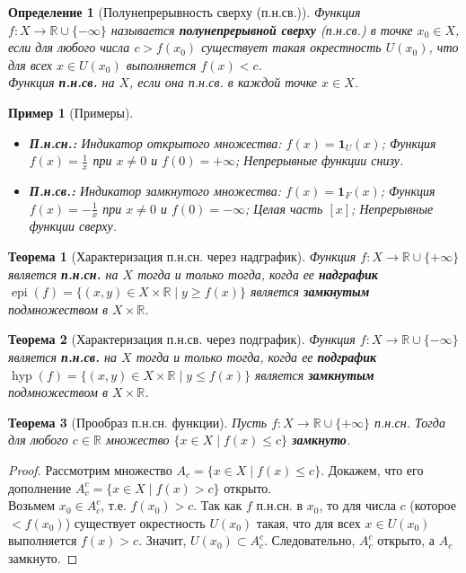 \documentclass[a4paper, 12pt]{article}
\newtheorem{definition}{Определение}
\newtheorem{theorem}{Теорема}
\newtheorem{example}{Пример}
\newcommand{\R}{\mathbb{R}}
\newcommand{\1}{\mathbf{1}}
\begin{document}
\begin{definition}[Полунепрерывность сверху (п.н.св.)]
    Функция $f: X \to \R \cup \{-\infty\}$ называется \textbf{полунепрерывной сверху} (п.н.св.) в точке $x_0 \in X$, если для любого числа $c > f(x_0)$ существует такая окрестность $U(x_0)$, что для всех $x \in U(x_0)$ выполняется $f(x) < c$. \\
    Функция \textbf{п.н.св.} на $X$, если она п.н.св. в каждой точке $x \in X$.
\end{definition}

\begin{example}[Примеры]
    \hfill
    \begin{itemize}
        \item \textbf{П.н.сн.:} Индикатор открытого множества: $f(x) = \1_U(x)$; Функция $f(x) = \frac{1}{x}$ при $x \neq 0$ и $f(0) = +\infty$; Непрерывные функции снизу.
        \item \textbf{П.н.св.:} Индикатор замкнутого множества: $f(x) = \1_F(x)$; Функция $f(x) = -\frac{1}{x}$ при $x \neq 0$ и $f(0) = -\infty$; Целая часть $[x]$; Непрерывные функции сверху.
    \end{itemize}
\end{example}

\begin{theorem}[Характеризация п.н.сн. через надграфик]
    Функция $f: X \to \R \cup \{+\infty\}$ является \textbf{п.н.сн.} на $X$ тогда и только тогда, когда ее \textbf{надграфик} $\operatorname{epi}(f) = \{(x,y) \in X \times \R \mid y \geq f(x)\}$ является \textbf{замкнутым} подмножеством в $X \times \R$.
\end{theorem}

\begin{theorem}[Характеризация п.н.св. через подграфик]
    Функция $f: X \to \R \cup \{-\infty\}$ является \textbf{п.н.св.} на $X$ тогда и только тогда, когда ее \textbf{подграфик} $\operatorname{hyp}(f) = \{(x,y) \in X \times \R \mid y \leq f(x)\}$ является \textbf{замкнутым} подмножеством в $X \times \R$.
\end{theorem}

\begin{theorem}[Прообраз п.н.сн. функции]
    Пусть $f: X \to \R \cup \{+\infty\}$ п.н.сн. Тогда для любого $c \in \R$ множество $\{x \in X \mid f(x) \leq c\}$ \textbf{замкнуто}.
\end{theorem}

\begin{proof}
    Рассмотрим множество $A_c = \{x \in X \mid f(x) \leq c\}$. Докажем, что его дополнение $A_c^c = \{x \in X \mid f(x) > c\}$ открыто. \\
    Возьмем $x_0 \in A_c^c$, т.е. $f(x_0) > c$. Так как $f$ п.н.сн. в $x_0$, то для числа $c$ (которое $< f(x_0)$) существует окрестность $U(x_0)$ такая, что для всех $x \in U(x_0)$ выполняется $f(x) > c$. Значит, $U(x_0) \subset A_c^c$. Следовательно, $A_c^c$ открыто, а $A_c$ замкнуто.
\end{proof}
\end{document}

